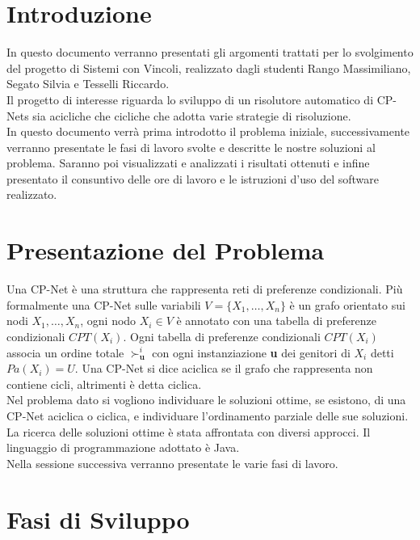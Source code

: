 \documentclass[a4paper,titlepage]{article}
\begin{document}
\tableofcontents

\newpage
\section{Introduzione}
In questo documento verranno presentati gli argomenti trattati per lo svolgimento del progetto di Sistemi con Vincoli, realizzato dagli studenti Rango Massimiliano, Segato Silvia e Tesselli Riccardo.\\Il progetto di interesse riguarda lo sviluppo di un risolutore automatico di CP-Nets sia acicliche che cicliche che adotta varie strategie di risoluzione.\\In questo documento verrà prima introdotto il problema iniziale, successivamente verranno presentate le fasi di lavoro svolte e descritte le nostre soluzioni al problema. Saranno poi visualizzati e analizzati i risultati ottenuti e infine presentato il consuntivo delle ore di lavoro e le istruzioni d'uso del software realizzato.

\section{Presentazione del Problema}
Una CP-Net è una struttura che rappresenta reti di preferenze condizionali. Più formalmente una CP-Net sulle variabili $V = \{X_{1},\dots, X_{n}\}$ è un grafo orientato sui nodi $X_{1},\dots, X_{n}$, ogni nodo $X_{i} \in V$ è annotato con una tabella di preferenze condizionali $CPT(X_{i})$. Ogni tabella di preferenze condizionali $CPT(X_{i})$ associa un ordine totale $\succ^{i}_{\textbf{u}}$ con ogni instanziazione \textbf{u} dei genitori di $X_{i}$ detti $Pa(X_{i}) = U$. Una CP-Net si dice aciclica se il grafo che rappresenta non contiene cicli, altrimenti è detta ciclica.\\
Nel problema dato si vogliono individuare le soluzioni ottime, se esistono, di una CP-Net aciclica o ciclica, e individuare l'ordinamento parziale delle sue soluzioni. La ricerca delle soluzioni ottime è stata affrontata con diversi approcci. Il linguaggio di programmazione adottato è Java.\\Nella sessione successiva verranno presentate le varie fasi di lavoro.


\section{Fasi di Sviluppo}
\end{document}
